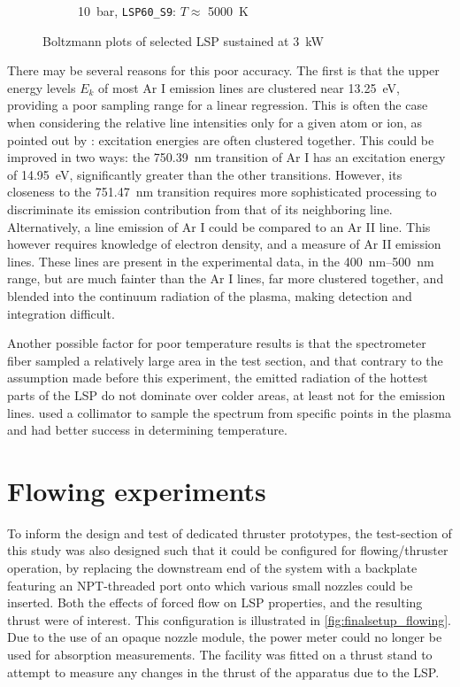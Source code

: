 \begin{figure}[h]
\begin{subfigure}[t]{0.47\textwidth}
                    \caption{\qty{10}{bar}, \texttt{LSP60\_S9}: $T \approx$ \qty{5000}{K}}
                    \label{fig:boltzmann_LSP60_S9}
                \end{subfigure}
                \caption{Boltzmann plots of selected LSP sustained at \qty{3}{kW}}
                \label{fig:boltzmannplot}
            \end{figure}

            There may be several reasons for this poor accuracy. The first is that the upper energy levels $E_k$ of most Ar I emission lines are clustered near \qty{13.25}{eV}, providing a poor sampling range for a linear regression. This is often the case when considering the relative line intensities only for a given atom or ion, as pointed out by \textcite{griemSpectroscopicTemperatureMeasurements1997}: excitation energies are often clustered together. This could be improved in two ways: the \qty{750.39}{nm} transition of Ar I has an excitation energy of \qty{14.95}{eV}, significantly greater than the other transitions. However, its closeness to the \qty{751.47}{nm} transition requires more sophisticated processing to discriminate its emission contribution from that of its neighboring line. Alternatively, a line emission of Ar I could be compared to an Ar II line. This however requires knowledge of electron density, and a measure of Ar II emission lines. These lines are present in the experimental data, in the \qtyrange{400}{500}{nm} range, but are much fainter than the Ar I lines, far more clustered together, and blended into the continuum radiation of the plasma, making detection and integration difficult.

            Another possible factor for poor temperature results is that the spectrometer fiber sampled a relatively large area in the test section, and that contrary to the assumption made before this experiment, the emitted radiation of the hottest parts of the LSP do not dominate over colder areas, at least not for the emission lines.  \textcite{nassarInvestigationLasersustainedPlasma2012} used a collimator to sample the spectrum from specific points in the plasma and had better success in determining temperature. 
    
    \section{Flowing experiments}
        To inform the design and test of dedicated thruster prototypes, the test-section of this study was also designed such that it could be configured for flowing/thruster operation, by replacing the downstream end of the system with a backplate featuring an NPT-threaded port onto which various small nozzles could be inserted. Both the effects of forced flow on LSP properties, and the resulting thrust were of interest. This configuration is illustrated in \autoref{fig:finalsetup_flowing}. Due to the use of an opaque nozzle module, the power meter could no longer be used for absorption measurements. The facility was fitted on a thrust stand to attempt to measure any changes in the thrust of the apparatus due to the LSP.

